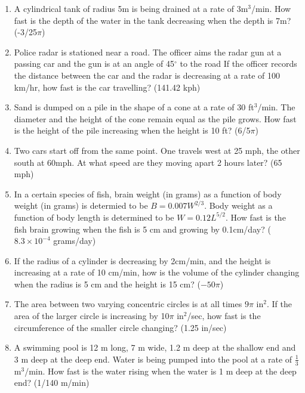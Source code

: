 \documentclass[11pt]{article}
\begin{document}
\begin{enumerate}
  \item{A cylindrical tank of radius 5m is being drained at a rate of 3m$^3$/min.  How fast is the depth of the water in the tank decreasing
  when the depth is 7m?  (-3/25$\pi$)}
  

\item{Police radar is stationed near a road.  The officer aims the radar gun at a passing car and the gun is at an angle of 45$^{\circ}$ to the road
  If the officer records the distance between the car and the radar is decreasing at a rate of 100 km/hr, how fast is the car travelling? (141.42 kph)
}

\item{Sand is dumped on a pile in the shape of a cone at a rate of 30 ft$^3$/min.  The diameter and the height of the cone remain equal as the pile
  grows.  How fast is the height of the pile increasing when the height is 10 ft?  (6/5$\pi$)
}

\item{Two cars start off from the same point.  One travels west at 25 mph, the other south at 60mph.  At what speed are they moving apart 2 hours later?  (65 mph)
}
\item{In a certain species of fish, brain weight (in grams) as a function of body weight (in grams) is determied to be $B=0.007W^{2/3}$.  Body weight as a function of body length is determined to be $W=0.12L^{5/2}$.  How fast is the fish brain growing when the fish is 5 cm and growing by 0.1cm/day?  ($8.3\times10^{-4}$ grams/day)
}

\item{If the radius of a cylinder is decreasing by 2cm/min, and the height is increasing at a rate of 10 cm/min, how is the volume of the cylinder changing when the radius is 5 cm and the height is 15 cm?  ($-50\pi$)}

\item{The area between two varying concentric circles is at all times $9\pi$ in$^2$. If the area of the larger circle is increasing by 10$\pi$ in$^2$/sec, how
fast is the circumference of the smaller circle changing?  (1.25 in/sec)}

\item{A swimming pool is 12 m long, 7 m wide, 1.2 m deep at the shallow end and 3 m deep at the deep end.  Water is being pumped into the pool
  at a rate of $\frac13$m$^3$/min.  How fast is the water rising when the water is 1 m deep at the deep end?
(1/140 m/min)}

\end{enumerate}
\end{document}
